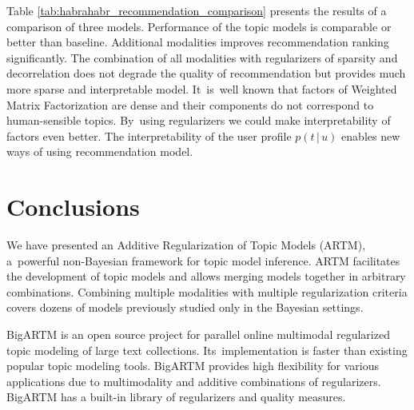 \documentclass{acm_proc_article-sp}
\newcommand{\cond}{\mspace{3mu}{|}\mspace{3mu}}
\begin{document}
Table \ref{tab:habrahabr_recommendation_comparison} presents the results of a comparison of three models.
Performance of the topic models is comparable or better than baseline.
Additional modalities improves recommendation ranking significantly.
The combination of all modalities with regularizers of sparsity and decorrelation
does not degrade the quality of recommendation but provides much more sparse and interpretable model.
It~is~well known that factors of Weighted Matrix Factorization are dense and their components do not correspond to human-sensible topics.
By~using regularizers we could make interpretability of factors even better.
The interpretability of the user profile $p(t\cond u)$ enables new ways of using recommendation model.


%


\section{Conclusions}
\label{sec:Conclusions}
We have presented an Additive Regularization of Topic Models (ARTM),
a~powerful non-Bayesian framework for topic model inference.
ARTM facilitates the development of topic models and allows merging models together in arbitrary combinations.
Combining multiple modalities with multiple regularization criteria
covers dozens of models previously studied only in the Bayesian settings.

\mbox{BigARTM} is an open source project
for parallel online multimodal regularized topic modeling of large text collections.
Its~implementation is faster than existing popular topic modeling tools.
\mbox{BigARTM} provides high flexibility for various applications due to
multimodality and additive combinations of regularizers.
\mbox{BigARTM} has a built-in library of regularizers and quality measures.
\end{document}

